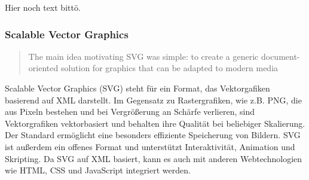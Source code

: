         Hier noch text bittö.
        
    
    \subsubsection{Scalable Vector Graphics}
        \begin{quote}
            The main idea motivating \ac{SVG} was simple: to create a generic document-oriented solution  for graphics that can be adapted to modern media
            \grqq{}~
        \end{quote}
        Scalable Vector Graphics (SVG) steht für ein Format, das Vektorgafiken basierend auf \ac{XML} darstellt.
        Im Gegensatz zu Rastergrafiken, wie z.B. PNG, die aus Pixeln bestehen und bei Vergrößerung an Schärfe verlieren, sind Vektorgrafiken vektorbasiert und behalten ihre Qualität bei beliebiger Skalierung. 
        Der Standard ermöglicht eine besonders effiziente Speicherung von Bildern.
        SVG ist außerdem ein offenes Format und unterstützt Interaktivität, Animation und Skripting. 
        Da SVG auf XML basiert, kann es auch mit anderen Webtechnologien wie HTML, \ac{CSS} und JavaScript integriert werden. 
        
